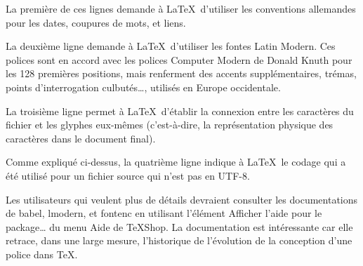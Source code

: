 \documentclass[11pt,french]{article}
\newcommand{\TS}{\textsf{\TeX Shop}}
\newcommand{\acr}[1]{\textsf{#1}}
\newcommand{\cmd}[1]{\textsf{#1}}
\begin{document}
La première de ces lignes demande à \LaTeX\ d'utiliser les conventions allemandes pour les dates, coupures de mots, et liens.

La deuxième ligne demande à \LaTeX\ d'utiliser les fontes Latin Modern. Ces polices sont en accord avec les polices Computer Modern de Donald Knuth pour les 128 premières positions, mais renferment des accents supplémentaires, trémas, points d'interrogation culbutés…, utilisés en Europe occidentale.

La troisième ligne permet à \LaTeX\ d'établir la connexion entre les caractères du fichier et les glyphes eux-mêmes (c'est-à-dire, la représentation physique des caractères dans le document final).

Comme expliqué ci-dessus, la quatrième ligne indique à \LaTeX\ le codage qui a été utilisé pour un fichier source qui n'est pas en \acr{UTF-8}.

Les utilisateurs qui veulent plus de détails devraient consulter les documentations de \cmd{babel}, \cmd{lmodern}, et \cmd{fontenc} en utilisant l'élément \cmd{Afficher l'aide pour le package…} du menu \cmd{Aide} de \TS. La documentation est intéressante car elle retrace, dans une large mesure, l'historique de l'évolution de la conception d'une police dans \TeX.



\end{document}
